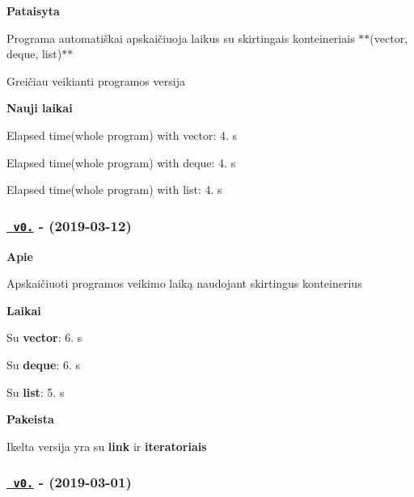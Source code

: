 {\bfseries{Pataisyta}}


\begin{DoxyItemize}
\item Programa automatiškai apskaičiuoja laikus su skirtingais konteineriais $\ast$$\ast$(vector, deque, list)$\ast$$\ast$
\item Greičiau veikianti programos versija
\end{DoxyItemize}

{\bfseries{Nauji laikai}}


\begin{DoxyItemize}
\item Elapsed time(whole program) with vector\+: 4. s
\item Elapsed time(whole program) with deque\+: 4. s
\item Elapsed time(whole program) with list\+: 4. s
\end{DoxyItemize}

\subsubsection*{\href{https://github.com/ToNyHasK/VUObjektinisNO2/releases/tag/v0.5}{\texttt{ v0.}} -\/ (2019-\/03-\/12)}

{\bfseries{Apie}}


\begin{DoxyItemize}
\item Apskaičiuoti programos veikimo laiką naudojant skirtingus konteinerius
\end{DoxyItemize}

{\bfseries{Laikai}}


\begin{DoxyItemize}
\item Su {\bfseries{vector}}\+: 6. s
\item Su {\bfseries{deque}}\+: 6. s
\item Su {\bfseries{list}}\+: 5. s
\end{DoxyItemize}

{\bfseries{Pakeista}}


\begin{DoxyItemize}
\item Ikelta versija yra su {\bfseries{link}} ir {\bfseries{iteratoriais}}
\end{DoxyItemize}

\subsubsection*{\href{https://github.com/ToNyHasK/VUObjektinisNO2/releases/tag/v0.4}{\texttt{ v0.}} -\/ (2019-\/03-\/01)}

